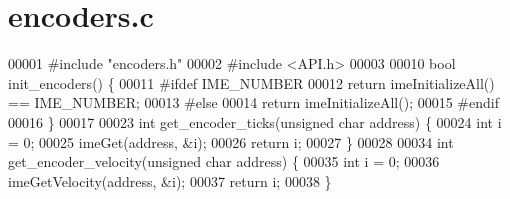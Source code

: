 \section{encoders.\+c}
\label{encoders_8c_source}

\begin{DoxyCode}
00001 \textcolor{preprocessor}{#include "encoders.h"}
00002 \textcolor{preprocessor}{#include <API.h>}
00003 
00010 \textcolor{keywordtype}{bool} init_encoders() \{
00011 \textcolor{preprocessor}{  #ifdef IME\_NUMBER}
00012   \textcolor{keywordflow}{return} imeInitializeAll() == IME_NUMBER;
00013 \textcolor{preprocessor}{  #else}
00014   \textcolor{keywordflow}{return} imeInitializeAll();
00015 \textcolor{preprocessor}{  #endif}
00016 \}
00017 
00023 \textcolor{keywordtype}{int} get_encoder_ticks(\textcolor{keywordtype}{unsigned} \textcolor{keywordtype}{char} address) \{
00024   \textcolor{keywordtype}{int} i = 0;
00025   imeGet(address, &i);
00026   \textcolor{keywordflow}{return} i;
00027 \}
00028 
00034 \textcolor{keywordtype}{int} get_encoder_velocity(\textcolor{keywordtype}{unsigned} \textcolor{keywordtype}{char} address) \{
00035   \textcolor{keywordtype}{int} i = 0;
00036   imeGetVelocity(address, &i);
00037   \textcolor{keywordflow}{return} i;
00038 \}
\end{DoxyCode}
